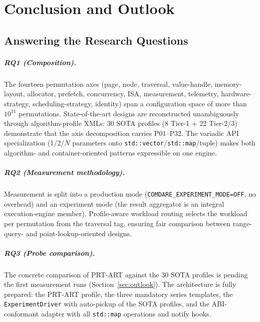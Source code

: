 \chapter{Conclusion and Outlook}\label{ch:conclusion}

\section{Answering the Research Questions}\label{sec:answers}

\paragraph{RQ1 (Composition).} The fourteen permutation axes (page, node, traversal,
value-handle, memory-layout, allocator, prefetch, concurrency, ISA, measurement,
telemetry, hardware-strategy, scheduling-strategy, identity) span a configuration space of
more than $10^{11}$ permutations. State-of-the-art designs are reconstructed
unambiguously through algorithm-profile XMLs: 30 SOTA profiles (8 Tier-1 + 22 Tier-2/3)
demonstrate that the axis decomposition carries P01--P32. The variadic API
specialization (1/2/$N$ parameters onto \texttt{std::vector}/\texttt{std::map}/tuple) makes
both algorithm- and container-oriented patterns expressible on one engine.

\paragraph{RQ2 (Measurement methodology).} Measurement is split into a production mode
(\texttt{COMDARE\_EXPERIMENT\_MODE=OFF}, no overhead) and an experiment mode (the result
aggregator is an integral execution-engine member). Profile-aware workload routing selects
the workload per permutation from the traversal tag, ensuring fair comparison between
range-query- and point-lookup-oriented designs.

\paragraph{RQ3 (Probe comparison).} The concrete comparison of PRT-ART against the 30 SOTA
profiles is pending the first measurement runs (Section~\ref{sec:outlook}). The
architecture is fully prepared: the PRT-ART profile, the three mandatory series templates,
the \texttt{ExperimentDriver} with auto-pickup of the SOTA profiles, and the ABI-conformant
adapter with all \texttt{std::map} operations and notify hooks.

